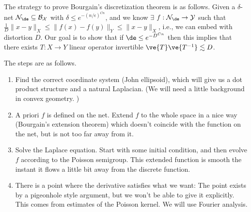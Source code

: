The strategy to prove Bourgain's discretization theorem is as follows. Given a $\delta$-net $\cal N_{\de} \subseteq B_X$ with $\delta \leq e^{-(n/\epsilon)^{Cn}}$, and we know $\exists $ $f: \cal N_{\de} \to Y$ such that $\frac{1}{D}\|x - y\|_X \leq \|f(x) - f(y)\|_Y \leq \|x - y\|_X$, i.e., we can embed with distortion $D$. 
Our goal is to show that if $\de\le e^{-D^{Cn}}$ then this implies that there exists $T:X\to Y$ linear operator invertible $\ve{T}\ve{T^{-1}}\lesssim D$. 

The steps are as follows. 
\begin{enumerate}
\item
Find the correct coordinate system (John ellipsoid), which will give us a dot product structure and a natural Laplacian. (We will need a little background in convex geometry. )
\item
A priori $f$ is defined on the net. Extend $f$ to the whole space in a nice way (Bourgain's extension theorem) which doesn't coincide with the function on the net, but is not too far away from it.
\item
Solve the Laplace equation. Start with some initial condition, and then evolve $f$ according to the Poisson semigroup. This extended function is smooth the instant it flows a little bit away from the discrete function.
\item
There is a point where the derivative satisfies what we want: The point exists by a pigeonhole style argument, but we won't be able to give it explicitly. This comes from estimates of the Poisson kernel. We will use Fourier analysis. 
\end{enumerate}
